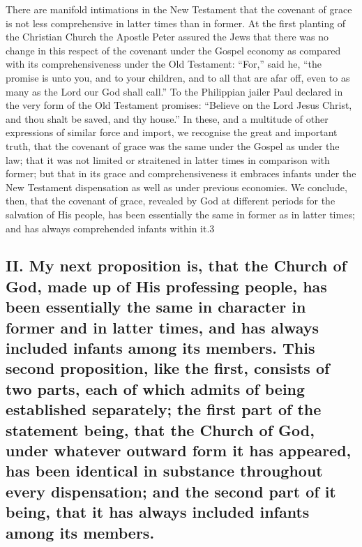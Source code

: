 \documentclass[]{book}
\begin{document}
There are manifold intimations in the New Testament that the covenant of grace is not less comprehensive in latter times than in former. At the first planting of the Christian Church the Apostle Peter assured the Jews that there was no change in this respect of the covenant under the Gospel economy as compared with its comprehensiveness under the Old Testament: ``For,'' said he, ``the promise is unto you, and to your children, and to all that are afar off, even to as many as the Lord our God shall call.'' To the Philippian jailer Paul declared in the very form of the Old Testament promises: ``Believe on the Lord Jesus Christ, and thou shalt be saved, and thy house.'' In these, and a multitude of other expressions of similar force and import, we recognise the great and important truth, that the covenant of grace was the same under the Gospel as under the law; that it was not limited or straitened in latter times in comparison with former; but that in its grace and comprehensiveness it embraces infants under the New Testament dispensation as well as under previous economies. We conclude, then, that the covenant of grace, revealed by God at different periods for the salvation of His people, has been essentially the same in former as in latter times; and has always comprehended infants within it.3

\hypertarget{ii.-my-next-proposition-is-that-the-church-of-god-made-up-of-his-professing-people-has-been-essentially-the-same-in-character-in-former-and-in-latter-times-and-has-always-included-infants-among-its-members.-this-second-proposition-like-the-first-consists-of-two-parts-each-of-which-admits-of-being-established-separately-the-first-part-of-the-statement-being-that-the-church-of-god-under-whatever-outward-form-it-has-appeared-has-been-identical-in-substance-throughout-every-dispensation-and-the-second-part-of-it-being-that-it-has-always-included-infants-among-its-members.}{%
\subsection{II. My next proposition is, that the Church of God, made up of His professing people, has been essentially the same in character in former and in latter times, and has always included infants among its members. This second proposition, like the first, consists of two parts, each of which admits of being established separately; the first part of the statement being, that the Church of God, under whatever outward form it has appeared, has been identical in substance throughout every dispensation; and the second part of it being, that it has always included infants among its members.}\label{ii.-my-next-proposition-is-that-the-church-of-god-made-up-of-his-professing-people-has-been-essentially-the-same-in-character-in-former-and-in-latter-times-and-has-always-included-infants-among-its-members.-this-second-proposition-like-the-first-consists-of-two-parts-each-of-which-admits-of-being-established-separately-the-first-part-of-the-statement-being-that-the-church-of-god-under-whatever-outward-form-it-has-appeared-has-been-identical-in-substance-throughout-every-dispensation-and-the-second-part-of-it-being-that-it-has-always-included-infants-among-its-members.}}
\end{document}
